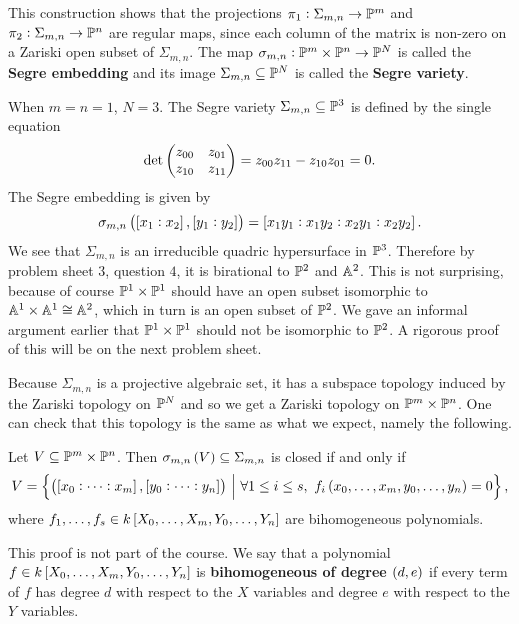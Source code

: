 This construction shows that the projections $ \pi_1 : \Sigma_{m, n} \to \PP^m $ and $ \pi_2 : \Sigma_{m, n} \to \PP^n $ are regular maps, since each column of the matrix is non-zero on a Zariski open subset of $ \Sigma_{m, n} $. The map $ \sigma_{m, n} : \PP^m \times \PP^n \to \PP^N $ is called the \textbf{Segre embedding} and its image $ \Sigma_{m, n} \subseteq \PP^N $ is called the \textbf{Segre variety}.


\begin{example*}
When $ m = n = 1 $, $ N = 3 $. The Segre variety $ \Sigma_{m, n} \subseteq \PP^3 $ is defined by the single equation
$$ \det \twobytwo{z_{00}}{z_{01}}{z_{10}}{z_{11}} = z_{00}z_{11} - z_{10}z_{01} = 0. $$
The Segre embedding is given by
$$ \sigma_{m, n}\br{\sbr{x_1 : x_2}, \sbr{y_1 : y_2}} = \sbr{x_1y_1 : x_1y_2 : x_2y_1 : x_2y_2}. $$
We see that $ \Sigma_{m, n} $ is an irreducible quadric hypersurface in $ \PP^3 $. Therefore by problem sheet $ 3 $, question $ 4 $, it is birational to $ \PP^2 $ and $ \AA^2 $. This is not surprising, because of course $ \PP^1 \times \PP^1 $ should have an open subset isomorphic to $ \AA^1 \times \AA^1 \cong \AA^2 $, which in turn is an open subset of $ \PP^2 $. We gave an informal argument earlier that $ \PP^1 \times \PP^1 $ should not be isomorphic to $ \PP^2 $. A rigorous proof of this will be on the next problem sheet.
\end{example*}

\pagebreak

Because $ \Sigma_{m, n} $ is a projective algebraic set, it has a subspace topology induced by the Zariski topology on $ \PP^N $ and so we get a Zariski topology on $ \PP^m \times \PP^n $. One can check that this topology is the same as what we expect, namely the following.

\begin{lemma}
Let $ V \subseteq \PP^m \times \PP^n $. Then $ \sigma_{m, n}\br{V} \subseteq \Sigma_{m, n} $ is closed if and only if
$$ V = \cbr{\br{\sbr{x_0 : \dots : x_m}, \sbr{y_0 : \dots : y_n}} \st \forall 1 \le i \le s, \ f_i\br{x_0, \dots, x_m, y_0, \dots, y_n} = 0}, $$
where $ f_1, \dots, f_s \in k\sbr{X_0, \dots, X_m, Y_0, \dots, Y_n} $ are bihomogeneous polynomials.
\end{lemma}

This proof is not part of the course. We say that a polynomial $ f \in k\sbr{X_0, \dots, X_m, Y_0, \dots, Y_n} $ is \textbf{bihomogeneous of degree $ \br{d, e} $} if every term of $ f $ has degree $ d $ with respect to the $ X $ variables and degree $ e $ with respect to the $ Y $ variables.

